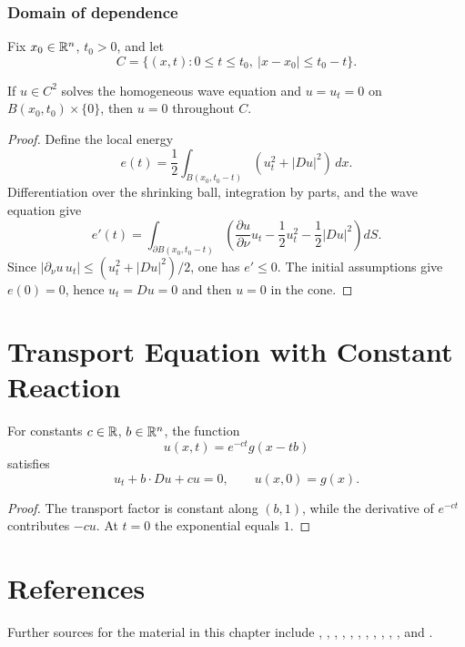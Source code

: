 \subsubsection{Domain of dependence}
\label{sec:wave-domain-of-dependence}

Fix $x_0\in\mathbb{R}^n$, $t_0>0$, and let
$$C=\{(x,t):0\le t\le t_0,\ |x-x_0|\le t_0-t\}.$$

\begin{theorem}
\label{thm:wave-equation-finite-propagation-speed}
If $u\in C^2$ solves the homogeneous wave equation and
$u=u_t=0$ on $B(x_0,t_0)\times\{0\}$, then $u=0$ throughout $C$.
\end{theorem}
\begin{proof}
\sketch Define the local energy
$$e(t)=\frac12\int_{B(x_0,t_0-t)}(u_t^2+|Du|^2)\,dx.$$
Differentiation over the shrinking ball, integration by parts, and the wave
equation give
$$e'(t)=\int_{\partial B(x_0,t_0-t)}
\left(\frac{\partial u}{\partial\nu}u_t-\frac12u_t^2-\frac12|Du|^2\right)dS.$$
Since $|\partial_\nu u\,u_t|\le(u_t^2+|Du|^2)/2$, one has $e'\le0$.
The initial assumptions give $e(0)=0$, hence $u_t=Du=0$ and then $u=0$ in
the cone.
\end{proof}

\section{Transport Equation with Constant Reaction}
\label{sec:transport-equation-constant-reaction}

\begin{theorem}
\label{ex:transport-reaction-equation}




For constants $c\in\mathbb{R}$, $b\in\mathbb{R}^n$, the function
$$u(x,t)=e^{-ct}g(x-tb)$$
satisfies
$$u_t+b\cdot Du+cu=0,
\qquad
u(x,0)=g(x).$$
\end{theorem}
\begin{proof}

\sketch The transport factor is constant along $(b,1)$, while the derivative
of $e^{-ct}$ contributes $-cu$. At $t=0$ the exponential equals $1$.
\end{proof}

\section{References}
\label{sec:chapter2-references}

Further sources for the material in this chapter include
\cite{FeynmanLeightonSands1966},
\cite{GilbargTrudinger1983},
\cite{Mikhailov1978},
\cite{John1982}, \cite{Friedman1964},
\cite{Watson1973}, \cite{John1982}, \cite{Mikhailov1978},
\cite{Payne1975}, \cite{Antman1980}, \cite{Folland1976}, and
\cite{Strauss1992}.

